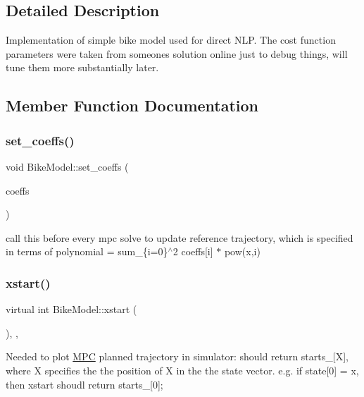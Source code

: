 \subsection{Detailed Description}
Implementation of simple bike model used for direct N\+LP. The cost function parameters were taken from someone\textquotesingle{}s solution online just to debug things, will tune them more substantially later. 

\subsection{Member Function Documentation}
\mbox{\label{classBikeModel_a697e6ec00a4a38ca844c491041cc9b86}} 
\subsubsection{\texorpdfstring{set\+\_\+coeffs()}{set\_coeffs()}}
{\footnotesize\ttfamily void Bike\+Model\+::set\+\_\+coeffs (\begin{DoxyParamCaption}\item[{const Vector\+Xd \&}]{coeffs }\end{DoxyParamCaption})\hspace{0.3cm}{\ttfamily [inline]}}

call this before every mpc solve to update reference trajectory, which is specified in terms of polynomial = sum\+\_\+\{i=0\}$^\wedge$2 coeffs\mbox{[}i\mbox{]} $\ast$ pow(x,i) \mbox{\label{classBikeModel_a920787379d6fef804f46bc1f3f885a89}} 
\subsubsection{\texorpdfstring{xstart()}{xstart()}}
{\footnotesize\ttfamily virtual int Bike\+Model\+::xstart (\begin{DoxyParamCaption}{ }\end{DoxyParamCaption})\hspace{0.3cm}{\ttfamily [inline]}, {\ttfamily [override]}, {\ttfamily [virtual]}}

Needed to plot \mbox{\hyperlink{classMPC}{M\+PC}} planned trajectory in simulator\+: should return starts\+\_\+\mbox{[}X\mbox{]}, where X specifies the the position of X in the the state vector. e.\+g. if state\mbox{[}0\mbox{]} = x, then xstart shoudl return starts\+\_\+\mbox{[}0\mbox{]}; 

